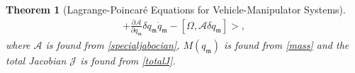 \documentclass[lettersize,journal]{IEEEtran}
\def \m  {\mathfrak{m}}
\def \A {\mathcal{A}}
\def \diag {\text{diag}}
\newtheorem{theorem}{Theorem}
\theoremstyle{remark}
\begin{document}
\begin{theorem}[Lagrange-Poincar\'{e} Equations for Vehicle-Manipulator Systems]
\begin{multline}
    +\frac{\partial \A}{\partial q_\mathfrak{m}}\delta q_\mathfrak{m} \dot{q}_\mathfrak{m}-[\Omega,\A\delta q_\mathfrak{m}]>,
\end{multline}
where $\A$ is found from \eqref{specialjabocian}, $M(q_\m)$ is found from \eqref{mass}
and the total Jacobian $\mathcal{J}$ is found from \eqref{totalJ}.%


\end{theorem}
\end{document}

